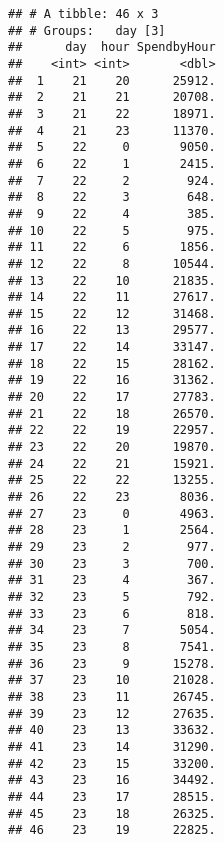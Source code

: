 \documentclass[]{article}
\newenvironment{Shaded}{\begin{snugshade}}{\end{snugshade}}
\newcommand{\KeywordTok}[1]{\textcolor[rgb]{0.13,0.29,0.53}{\textbf{#1}}}
\newcommand{\DataTypeTok}[1]{\textcolor[rgb]{0.13,0.29,0.53}{#1}}
\newcommand{\DecValTok}[1]{\textcolor[rgb]{0.00,0.00,0.81}{#1}}
\newcommand{\StringTok}[1]{\textcolor[rgb]{0.31,0.60,0.02}{#1}}
\newcommand{\CommentTok}[1]{\textcolor[rgb]{0.56,0.35,0.01}{\textit{#1}}}
\newcommand{\OperatorTok}[1]{\textcolor[rgb]{0.81,0.36,0.00}{\textbf{#1}}}
\newcommand{\NormalTok}[1]{#1}
\begin{document}
\begin{Shaded}
\end{Shaded}

\begin{verbatim}
## # A tibble: 46 x 3
## # Groups:   day [3]
##      day  hour SpendbyHour
##    <int> <int>       <dbl>
##  1    21    20      25912.
##  2    21    21      20708.
##  3    21    22      18971.
##  4    21    23      11370.
##  5    22     0       9050.
##  6    22     1       2415.
##  7    22     2        924.
##  8    22     3        648.
##  9    22     4        385.
## 10    22     5        975.
## 11    22     6       1856.
## 12    22     8      10544.
## 13    22    10      21835.
## 14    22    11      27617.
## 15    22    12      31468.
## 16    22    13      29577.
## 17    22    14      33147.
## 18    22    15      28162.
## 19    22    16      31362.
## 20    22    17      27783.
## 21    22    18      26570.
## 22    22    19      22957.
## 23    22    20      19870.
## 24    22    21      15921.
## 25    22    22      13255.
## 26    22    23       8036.
## 27    23     0       4963.
## 28    23     1       2564.
## 29    23     2        977.
## 30    23     3        700.
## 31    23     4        367.
## 32    23     5        792.
## 33    23     6        818.
## 34    23     7       5054.
## 35    23     8       7541.
## 36    23     9      15278.
## 37    23    10      21028.
## 38    23    11      26745.
## 39    23    12      27635.
## 40    23    13      33632.
## 41    23    14      31290.
## 42    23    15      33200.
## 43    23    16      34492.
## 44    23    17      28515.
## 45    23    18      26325.
## 46    23    19      22825.
\end{verbatim}
\end{document}
